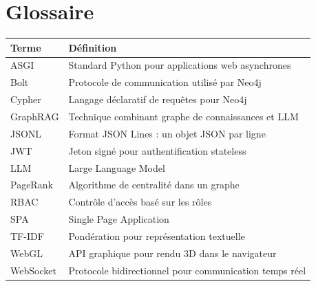 \documentclass[12pt,a4paper]{report}
\begin{document}
\chapter{Glossaire}
\begin{longtable}{p{4.5cm} p{10.5cm}}
\toprule
\textbf{Terme} & \textbf{Définition} \\
\midrule
ASGI & Standard Python pour applications web asynchrones \\
Bolt & Protocole de communication utilisé par Neo4j \\
Cypher & Langage déclaratif de requêtes pour Neo4j \\
GraphRAG & Technique combinant graphe de connaissances et LLM \\
JSONL & Format JSON Lines : un objet JSON par ligne \\
JWT & Jeton signé pour authentification stateless \\
LLM & Large Language Model \\
PageRank & Algorithme de centralité dans un graphe \\
RBAC & Contrôle d'accès basé sur les rôles \\
SPA & Single Page Application \\
TF-IDF & Pondération pour représentation textuelle \\
WebGL & API graphique pour rendu 3D dans le navigateur \\
WebSocket & Protocole bidirectionnel pour communication temps réel \\
\bottomrule
\end{longtable}
\end{document}
